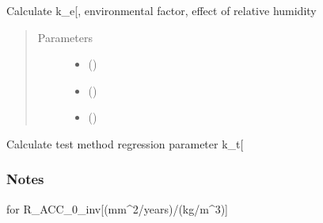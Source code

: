 \documentclass[letterpaper,10pt,english]{sphinxmanual}
\begin{document}
\begin{fulllineitems}
\label{\detokenize{carbonation:carbonation.k_e}}
\sphinxAtStartPar
Calculate k\_e{[}\sphinxhyphen{}{]}, environmental factor, effect of relative humidity
\begin{quote}\begin{description}
\item[{Parameters}] \leavevmode\begin{itemize}
\item {} 
\sphinxAtStartPar
{} (\sphinxstyleliteralemphasis{\sphinxupquote{ {[}}}\sphinxstyleliteralemphasis{\sphinxupquote{\%}}\sphinxstyleliteralemphasis{\sphinxupquote{{]}}}) \textendash{} 

\item {} 
\sphinxAtStartPar
{} (\sphinxstyleliteralemphasis{\sphinxupquote{ {[}}}\sphinxstyleliteralemphasis{\sphinxupquote{\sphinxhyphen{}}}\sphinxstyleliteralemphasis{\sphinxupquote{{]}}}) \textendash{} 

\item {} 
\sphinxAtStartPar
{} (\sphinxstyleliteralemphasis{\sphinxupquote{ {[}}}\sphinxstyleliteralemphasis{\sphinxupquote{\sphinxhyphen{}}}\sphinxstyleliteralemphasis{\sphinxupquote{{]}}}) \textendash{} 

\end{itemize}

\end{description}\end{quote}

\end{fulllineitems}


\begin{fulllineitems}
\label{\detokenize{carbonation:carbonation.k_t}}
\sphinxAtStartPar
Calculate test method regression parameter k\_t{[}\sphinxhyphen{}{]}
\subsubsection*{Notes}

\sphinxAtStartPar
for R\_ACC\_0\_inv{[}(mm\textasciicircum{}2/years)/(kg/m\textasciicircum{}3){]}

\end{fulllineitems}
\end{document}
